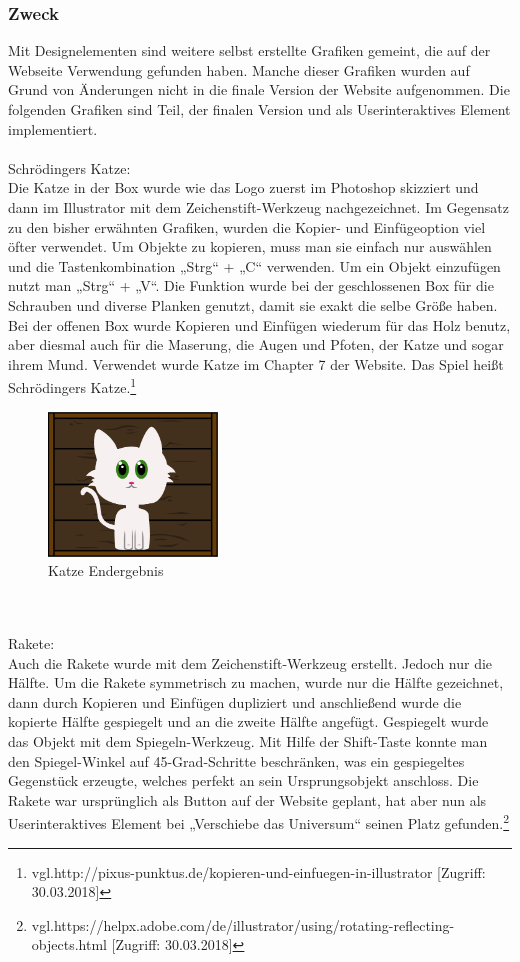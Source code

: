 \subsubsection{Zweck}
Mit Designelementen sind weitere selbst erstellte Grafiken gemeint, die auf der Webseite Verwendung gefunden haben. Manche dieser Grafiken wurden auf Grund von Änderungen nicht in die finale Version der Website aufgenommen. Die folgenden Grafiken sind Teil, der finalen Version und als Userinteraktives Element implementiert.
\leavevmode \\
\leavevmode \\
Schrödingers Katze:
\leavevmode \\
Die Katze in der Box wurde wie das Logo zuerst im Photoshop skizziert und dann im Illustrator mit dem Zeichenstift-Werkzeug nachgezeichnet. Im Gegensatz zu den bisher erwähnten Grafiken, wurden die Kopier- und Einfügeoption viel öfter verwendet. Um Objekte zu kopieren, muss man sie einfach nur auswählen und die Tastenkombination „Strg“ + „C“ verwenden. Um ein Objekt einzufügen nutzt man „Strg“ + „V“. Die Funktion wurde bei der geschlossenen Box für die Schrauben und diverse Planken genutzt, damit sie exakt die selbe Größe haben. Bei der offenen Box wurde Kopieren und Einfügen wiederum für das Holz benutz, aber diesmal auch für die Maserung, die Augen und Pfoten, der Katze und sogar ihrem Mund. Verwendet wurde Katze im Chapter 7 der Website. Das Spiel heißt Schrödingers Katze.\footnote{\label{} vgl.http://pixus-punktus.de/kopieren-und-einfuegen-in-illustrator [Zugriff: 30.03.2018]}

\begin{figure}[H] 
  \centering
     \includegraphics[width=0.4\textwidth]{design_abb8.png}
  \caption{Katze Endergebnis}
\end{figure}

\leavevmode \\
\leavevmode \\
Rakete: 
\leavevmode \\
Auch die Rakete wurde mit dem Zeichenstift-Werkzeug erstellt. Jedoch nur die Hälfte. Um die Rakete symmetrisch zu machen, wurde nur die Hälfte gezeichnet, dann durch Kopieren und Einfügen dupliziert und anschließend wurde die kopierte Hälfte gespiegelt und an die zweite Hälfte angefügt. Gespiegelt wurde das Objekt mit dem Spiegeln-Werkzeug. Mit Hilfe der Shift-Taste konnte man den Spiegel-Winkel auf 45-Grad-Schritte beschränken, was ein gespiegeltes Gegenstück erzeugte, welches perfekt an sein Ursprungsobjekt anschloss. Die Rakete war ursprünglich als Button auf der Website geplant, hat aber nun als Userinteraktives Element bei „Verschiebe das Universum“ seinen Platz gefunden.\footnote{\label{} vgl.https://helpx.adobe.com/de/illustrator/using/rotating-reflecting-objects.html [Zugriff: 30.03.2018]}

